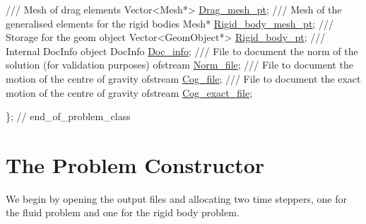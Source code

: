 \begin{DoxyCodeInclude}
\textcolor{comment}{}
\textcolor{comment}{ /// Mesh of drag elements}
\textcolor{comment}{} Vector<Mesh*> \hyperlink{classUnstructuredImmersedEllipseProblem_a9b4d04277b1f42c9428b610968f6f10d}{Drag\_mesh\_pt};
\textcolor{comment}{}
\textcolor{comment}{ /// Mesh of the generalised elements for the rigid bodies}
\textcolor{comment}{} Mesh* \hyperlink{classUnstructuredImmersedEllipseProblem_a34f1376227d4b995678eedd77813388b}{Rigid\_body\_mesh\_pt};
\textcolor{comment}{}
\textcolor{comment}{ /// Storage for the geom object}
\textcolor{comment}{} Vector<GeomObject*> \hyperlink{classUnstructuredImmersedEllipseProblem_aaa6d1c19f3634a6f08f3dd7e5046217e}{Rigid\_body\_pt};
 \textcolor{comment}{}
\textcolor{comment}{ /// Internal DocInfo object}
\textcolor{comment}{} DocInfo \hyperlink{classUnstructuredImmersedEllipseProblem_a1c463ed904f01e6466baae0533c79780}{Doc\_info};
 \textcolor{comment}{}
\textcolor{comment}{ /// File to document the norm of the solution (for validation purposes)}
\textcolor{comment}{} ofstream \hyperlink{classUnstructuredImmersedEllipseProblem_a71a3b24b610e05f7be916c4214dab8dc}{Norm\_file};
 \textcolor{comment}{}
\textcolor{comment}{ /// File to document the motion of the centre of gravity}
\textcolor{comment}{} ofstream \hyperlink{classUnstructuredImmersedEllipseProblem_acd1e8ec8e510f029f449f13dfdebbc99}{Cog\_file};
 \textcolor{comment}{}
\textcolor{comment}{ /// File to document the exact motion of the centre of gravity}
\textcolor{comment}{} ofstream \hyperlink{classUnstructuredImmersedEllipseProblem_a3dc1ec2e066466a6f228864b873d95fa}{Cog\_exact\_file};

\}; \textcolor{comment}{// end\_of\_problem\_class}

\end{DoxyCodeInclude}




 

 \hypertarget{index_constructor}{}\section{The Problem Constructor}\label{index_constructor}
We begin by opening the output files and allocating two time steppers, one for the fluid problem and one for the rigid body problem.


